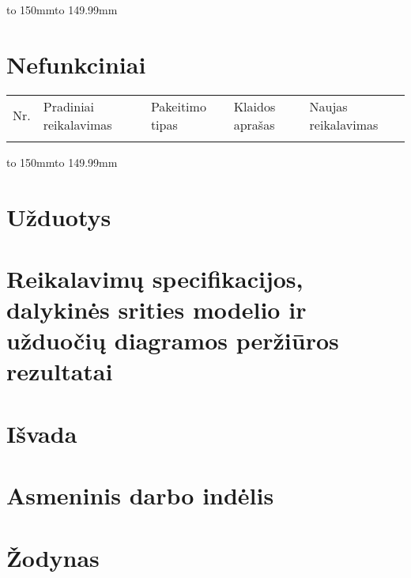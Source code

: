 \documentclass[oneside]{VUMIFPSkursinis}
\begin{document}
\hbox to 150mm{\hbox to 149.99mm{}}






 
\section{Nefunkciniai}


\begin{table}[htbp]

\begin{tabularx}{1\textwidth}{ |P{2.5cm}|X|P{3cm }| }  \hline

Nr. & Pradiniai reikalavimas&  Pakeitimo tipas & Klaidos aprašas  & Naujas reikalavimas \\ \\ \hline


\end{tabularx}
	
\end{table}	

\hbox to 150mm{\hbox to 149.99mm{}}


\section{Užduotys}

\section{Reikalavimų specifikacijos, dalykinės srities modelio ir užduočių diagramos peržiūros rezultatai}

\section{Išvada}

\section{Asmeninis darbo indėlis}

\section{Žodynas}


	
	
\end{document}
